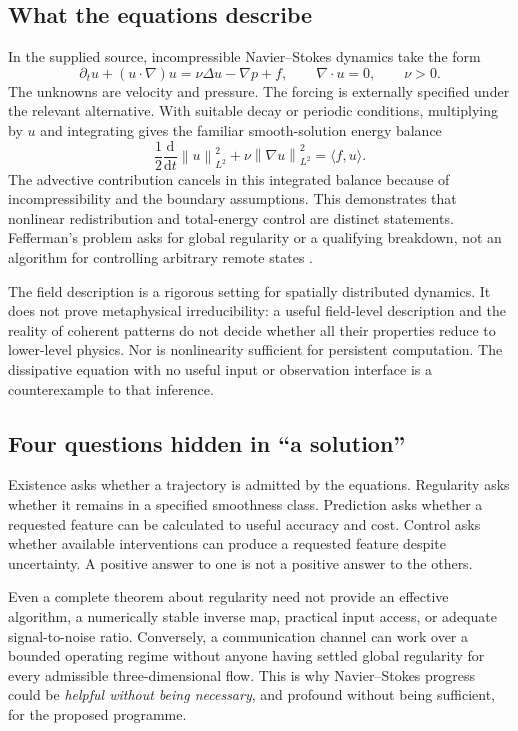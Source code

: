 \documentclass[11pt,a4paper]{article}
\theoremstyle{definition}
\theoremstyle{remark}
\newcommand{\norm}[1]{\left\lVert#1\right\rVert}
\begin{document}
\subsection{What the equations describe}
In the supplied source, incompressible Navier--Stokes dynamics take the form
\begin{equation}\label{eq:ns}
 \partial_t u+(u\cdot\nabla)u=\nu\Delta u-\nabla p+f,
 \qquad \nabla\cdot u=0,\qquad \nu>0.
\end{equation}
The unknowns are velocity and pressure. The forcing is externally specified under the relevant alternative. With suitable decay or periodic conditions, multiplying by $u$ and integrating gives the familiar smooth-solution energy balance
\begin{equation}\label{eq:energy}
 \frac{1}{2}\frac{\mathrm d}{\mathrm dt}\norm{u}_{L^2}^2
 +\nu\norm{\nabla u}_{L^2}^2
 =\langle f,u\rangle.
\end{equation}
The advective contribution cancels in this integrated balance because of incompressibility and the boundary assumptions. This demonstrates that nonlinear redistribution and total-energy control are distinct statements. Fefferman's problem asks for global regularity or a qualifying breakdown, not an algorithm for controlling arbitrary remote states \citep{fefferman}.

The field description is a rigorous setting for spatially distributed dynamics. It does not prove metaphysical irreducibility: a useful field-level description and the reality of coherent patterns do not decide whether all their properties reduce to lower-level physics. Nor is nonlinearity sufficient for persistent computation. The dissipative equation with no useful input or observation interface is a counterexample to that inference.

\subsection{Four questions hidden in ``a solution''}
Existence asks whether a trajectory is admitted by the equations. Regularity asks whether it remains in a specified smoothness class. Prediction asks whether a requested feature can be calculated to useful accuracy and cost. Control asks whether available interventions can produce a requested feature despite uncertainty. A positive answer to one is not a positive answer to the others.

Even a complete theorem about regularity need not provide an effective algorithm, a numerically stable inverse map, practical input access, or adequate signal-to-noise ratio. Conversely, a communication channel can work over a bounded operating regime without anyone having settled global regularity for every admissible three-dimensional flow. This is why Navier--Stokes progress could be \emph{helpful without being necessary}, and profound without being sufficient, for the proposed programme.
\end{document}
